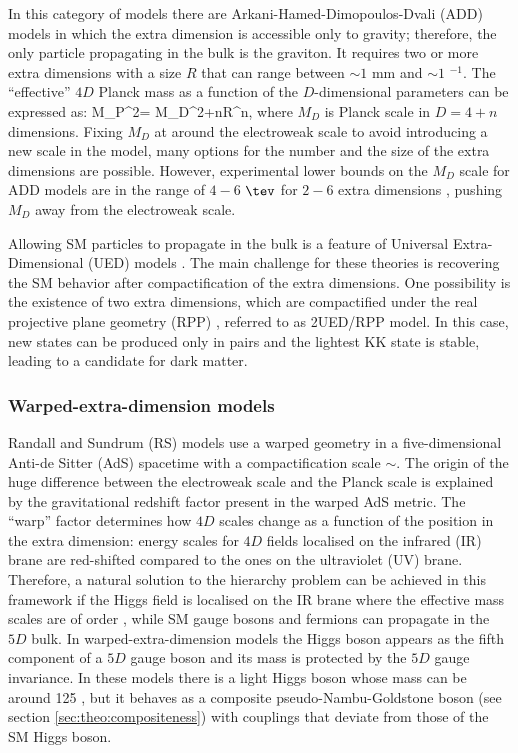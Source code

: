 In this category of models there are Arkani-Hamed-Dimopoulos-Dvali (ADD) models \cite{ArkaniHamed:1998rs} in which the extra dimension is accessible only to gravity; therefore, the only particle propagating in the bulk is the graviton. It requires two or more extra dimensions with a size $R$ that can range between $\sim1$ mm and $\sim1$ \tev$^{-1}$. The ``effective'' $4D$ Planck mass as a function of the $D$-dimensional parameters can be expressed as:
\be
M_{P}^{2}= M_{D}^{2+n}R^{n},
\ee
\noindent where $M_{D}$ is Planck scale in $D=4+n$ dimensions.  Fixing $M_{D}$ at around the electroweak scale to avoid introducing a new scale in the model, many options for the number and the size of the extra dimensions are possible. However, experimental lower bounds on the $M_{D}$ scale for ADD models are in the range of $4-6$ $\tev$ for $2-6$ extra dimensions \cite{Aaboud:2016tnv}, pushing $M_{D}$ away from the electroweak scale. \par
Allowing SM particles to propagate in the bulk is a feature of Universal Extra-Dimensional (UED) models \cite{Appelquist:2000nn}. The main challenge for these theories is recovering the SM behavior after compactification of the extra dimensions. One possibility is the existence of two extra dimensions, which are compactified under the real projective plane geometry (RPP) \cite{Burdman:2006gy,Cacciapaglia:2009pa}, referred to as 2UED/RPP model. In this case, new states can be produced only in pairs and the lightest KK state is stable, leading to a candidate for dark matter.

\subsubsection{Warped-extra-dimension models} 
\label{sec:theo:warped}

Randall and Sundrum (RS) \cite{Randall:1999vf,Contino:2006nn} models use a warped geometry in a five-dimensional Anti-de Sitter (AdS) spacetime with a compactification scale $\sim$\tev. The origin of the huge difference between the electroweak scale and the Planck scale is explained by the gravitational redshift factor present in the warped AdS metric. The ``warp'' factor determines how $4D$ scales change as a function of the position in the extra dimension:  energy scales for $4D$ fields localised on the infrared (IR) brane are red-shifted compared to the ones on the ultraviolet (UV) brane. Therefore, a natural solution to the hierarchy problem \cite{Randall:1999ee} can be achieved in this framework if the Higgs field is localised on the IR brane where the effective mass scales are of order \tev, while SM gauge bosons and fermions can propagate in the $5D$ bulk. In warped-extra-dimension models the Higgs boson appears as the fifth component of a $5D$ gauge boson and its mass is protected by the $5D$ gauge invariance.  In these models there is a light Higgs boson whose mass can be around 125 \gev, but it behaves as a composite pseudo-Nambu-Goldstone boson (see section \ref{sec:theo:compositeness}) with couplings that deviate from those of the SM Higgs boson.


